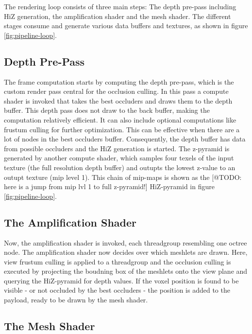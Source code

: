 \noindent
The rendering loop consists of three main steps: The depth pre-pass including \ac{HiZ} generation, the 
amplification shader and the mesh shader. The different stages consume and generate various data buffers 
and textures, as shown in figure \ref{fig:pipeline-loop}. 

\subsection*{Depth Pre-Pass} \label{subsec-depth-prepass}

The frame computation starts by computing the depth pre-pass, which is the custom render pass central 
for the occlusion culling. In this pass a compute shader is invoked that takes the best occluders and 
draws them to the depth buffer. This depth pass does not draw to the back buffer, making the computation 
relatively efficient. It can also include optional computations like frustum culling for further 
optimization. This can be effective when there are a lot of nodes in the best occluders buffer. 
Consequently, the depth buffer has data from possible occluders and the \ac{HiZ} generation is started. 
The z-pyramid is generated by another compute shader, which samples four texels of the input texture 
(the full resolution depth buffer) and outupts the lowest z-value to an outupt texture (mip level 1). 
This chain of mip-maps is shown as the [@TODO: here is a jump from mip lvl 1 to full z-pyramid!]
\ac{HiZ}-pyramid in figure \ref{fig:pipeline-loop}.


\subsection*{The Amplification Shader} \label{subsec-amplification-shader}

Now, the amplification shader is invoked, each threadgroup resembling one octree node. The amplification 
shader now decides over which meshlets are drawn. Here, view frustum culling is applied to a threadgroup 
and the occlusion culling is executed by projecting the boudning box of the meshlets onto the view plane 
and querying the \ac{HiZ}-pyramid for depth values. If the voxel position is found to be visible - or not 
occluded by the best occluders - the position is added to the payload, ready to be drawn by the mesh shader. 


\subsection*{The Mesh Shader} \label{subsec-mesh-shader}

